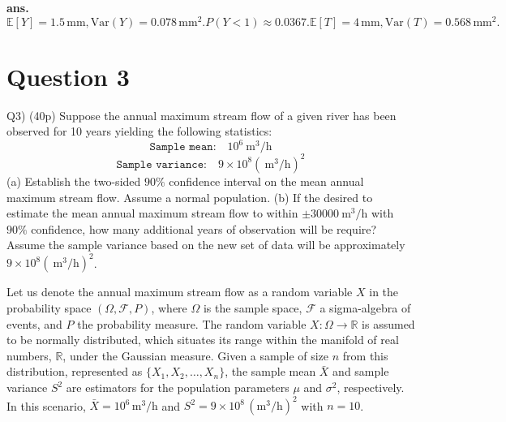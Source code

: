 \documentclass[12pt]{article}
\begin{document}
\vfill
\begin{flushright}
\textbf{ans.} \(\mathbb{E}[Y] = 1.5 \, \text{mm}, \text{Var}(Y)=0.078 \, \text{mm}^2. P(Y < 1) \approx 0.0367. \mathbb{E}[T]=4 \, \text{mm},  \text{Var}(T) =  0.568 \, \text{mm}^2.\)
\end{flushright}




\newpage
\section*{Question 3}
\begin{q}
Q3) (40p) Suppose the annual maximum stream flow of a given river has been observed for 10 years yielding the following statistics:
\[
\texttt{Sample mean:}\quad 10^6 \mathrm{~m}^3/\mathrm{h}
\]
\[
\texttt{Sample variance:} \quad  9 \times 10^8\left(\mathrm{~m}^3 / \mathrm{h}\right)^2
\]
(a) Establish the two-sided \(90 \%\) confidence interval on the mean annual maximum stream flow. Assume a normal population.
(b) If the desired to estimate the mean annual maximum stream flow to within \(\pm 30000 \mathrm{~m}^3 / \mathrm{h}\) with \(90 \%\) confidence, how many additional years of observation will be require? Assume the sample variance based on the new set of data will be approximately \(9 \times 10^8\left(\mathrm{~m}^3 / \mathrm{h}\right)^2\).
\end{q}
Let us denote the annual maximum stream flow as a random variable \( X \) in the probability space \((\Omega, \mathcal{F}, P)\), where \( \Omega \) is the sample space, \( \mathcal{F} \) a sigma-algebra of events, and \( P \) the probability measure. The random variable \( X: \Omega \to \mathbb{R} \) is assumed to be normally distributed, which situates its range within the manifold of real numbers, \( \mathbb{R} \), under the Gaussian measure. Given a sample of size \( n \) from this distribution, represented as \( \{X_1, X_2, \ldots, X_n\} \), the sample mean \( \bar{X} \) and sample variance \( S^2 \) are estimators for the population parameters \( \mu \) and \( \sigma^2 \), respectively. In this scenario, \( \bar{X} = 10^6 \, \text{m}^3/\text{h} \) and \( S^2 = 9 \times 10^8 \, (\text{m}^3/\text{h})^2 \) with \( n = 10 \).
\end{document}
